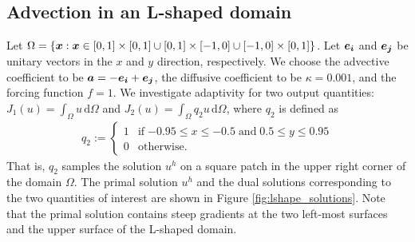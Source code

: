 \subsection{Advection in an L-shaped domain}

Let $\Omega = \{ \boldsymbol{x} :
\boldsymbol{x} \in [0,1] \times [0,1] \cup [0,1] \times [-1,0]
\cup [-1,0] \times [0,1] \}$.
Let $\boldsymbol{e_i}$ and $\boldsymbol{e_j}$ be unitary
vectors in the $x$ and $y$ direction, respectively.
We choose the advective coefficient to be
$\boldsymbol{a} = -\boldsymbol{e_i} + \boldsymbol{e_j}$, the diffusive
coefficient to be $\kappa = 0.001$, and the forcing
function $f=1$. We investigate adaptivity
for two output quantities:
$J_1(u) = \int_{\Omega} u \, \text{d} \Omega$ and
$J_2(u) = \int_{\Omega} q_2 u \, \text{d} \Omega$,
where $q_2$ is defined as
%
\begin{gather}
q_2 :=
\begin{cases}
1 & \text{if} \; {-0.95} \leq x \leq {-0.5} \;
\text{and} \; 0.5 \leq y \leq 0.95 \\
0 & \text{otherwise}.
\end{cases}
\end{gather}
%
That is, $q_2$ samples the solution $u^h$ on a square
patch in the upper right corner of the domain $\Omega$.
The primal solution $u^h$ and the dual solutions corresponding
to the two quantities of interest are shown in Figure
\ref{fig:lshape_solutions}. Note that the primal solution
contains steep gradients at the two left-most surfaces
and the upper surface of the L-shaped domain.

